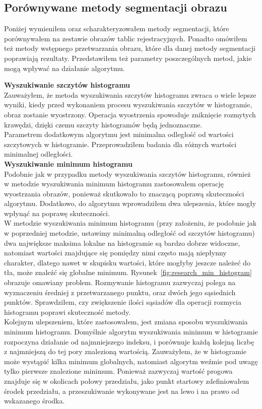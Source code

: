 \subsection{Porównywane metody segmentacji obrazu}
Poniżej wymieniłem oraz scharakteryzowałem metody segmentacji, które porównywałem na zestawie obrazów tablic rejestracyjnych. Ponadto omówiłem też metody wstępnego przetwarzania obrazu, które dla danej metody segmentacji poprawiają rezultaty. Przedstawiłem też parametry poszczególnych metod, jakie mogą wpływać na działanie algorytmu.

\textbf{Wyszukiwanie szczytów histogramu}\\
Zauważyłem, że metoda wyszukiwania szczytów histogramu zwraca o wiele lepsze wyniki, kiedy przed wykonaniem procesu wyszukiwania szczytów w histogramie, obraz zostanie wyostrzony. Operacja wyostrzenia spowoduje zniknięcie rozmytych krawędzi, dzięki czemu szczyty histogramów będą jednoznaczne. \\
Parametrem dodatkowym algorytmu jest minimalna odległość od wartości szczytowych w histogramie. Przeprowadziłem badania dla różnych wartości minimalnej odległości.\\

\textbf{Wyszukiwanie minimum histogramu}\\
Podobnie jak w przypadku metody wyszukiwania szczytów histogramu, również w metodzie wyszukiwania minimum histogramu zastosowałem operację wyostrzania obrazów, ponieważ skutkowało to znaczącą poprawą skuteczności algorytmu. Dodatkowo, do algorytmu wprowadziłem dwa ulepszenia, które mogły wpłynąć na poprawę skuteczności.\\
W metodzie wyszukiwania minimum histogramu (przy założeniu, że podobnie jak w poprzedniej metodzie, ustawimy minimalną odległość od szczytów histogramu) dwa największe maksima lokalne na histogramie są bardzo dobrze widoczne, natomiast wartości znajdujące się pomiędzy nimi często mają niepłynny charakter, dlatego nawet w skupisku wartości, które mogłyby jeszcze należeć do tła, może znaleźć się globalne minimum. Rysunek~\ref{fig:research_min_histogram} obrazuje omawiany problem. Rozmywanie histogramu zazwyczaj polega na wyznaczeniu średniej z przetwarzanego punktu, oraz dwóch jego sąsiednich punktów. Sprawdziłem, czy zwiększenie ilości sąsiadów dla operacji rozmycia histogramu poprawi skuteczność metody.\\
Kolejnym ulepszeniem, które zastosowałem, jest zmiana sposobu wyszukiwania minimum histogramu. Domyślnie algorytm wyszukiwania minimum w histogramie rozpoczyna działanie od najmniejszego indeksu, i porównuje każdą kolejną liczbę z najmniejszą do tej pory znalezioną wartością. Zauważyłem, że w histogramie może wystąpić kilka minimum globalnych, natomiast algorytm weźmie pod uwagę tylko pierwsze znalezione minimum. Ponieważ zazwyczaj wartość progowa znajduje się w okolicach połowy przedziału, jako punkt startowy zdefiniowałem środek przedziału, a przeszukiwanie wykonywane jest na lewo i na prawo od wskazanego środka.\\

